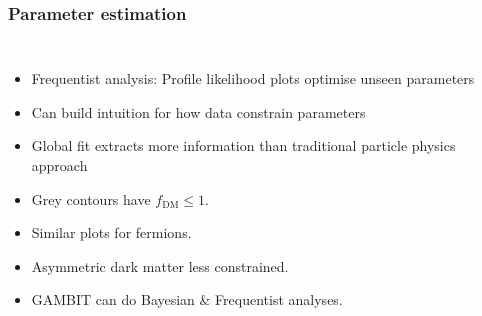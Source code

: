 \documentclass[aspectratio=169]{beamer}
\begin{document}
\begin{frame}
    \frametitle{Parameter estimation}
    \begin{columns}
        \begin{itemize}
            \item Frequentist analysis: Profile likelihood plots optimise unseen parameters 
            \item Can build intuition for how data constrain parameters
            \item Global fit extracts more information than traditional particle physics approach
            \item Grey contours have $f_\text{DM}\le1$.
            \item Similar plots for fermions.
            \item Asymmetric dark matter less constrained.
            \item GAMBIT can do Bayesian \& Frequentist analyses.
        \end{itemize}
        

\end{columns}
\end{frame}
\end{document}
